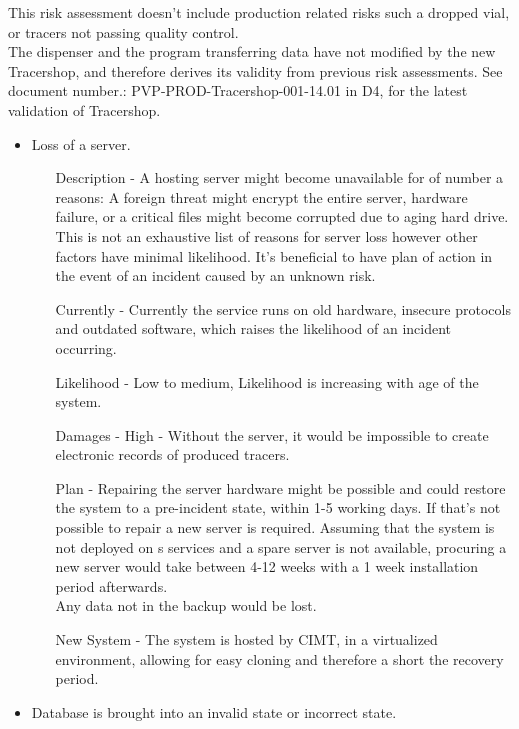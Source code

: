 \documentclass{article}
\begin{document}
This risk assessment doesn't include production related risks such a dropped
vial, or tracers not passing quality control.\\
The dispenser and the program transferring data have not modified by the new
Tracershop, and therefore derives its validity from previous risk assessments.
See document number.: PVP-PROD-Tracershop-001-14.01 in D4, for the latest
validation of Tracershop.

\begin{itemize}
  \item Loss of a server.
  \begin{itemize}
    \item[Description] - A hosting server might become unavailable for of number
    a reasons:
    A foreign threat might encrypt the entire server, hardware failure, or a
    critical files might become corrupted due to aging hard drive.
    This is not an exhaustive list of reasons for server loss however other
    factors have minimal likelihood.
    It's beneficial to have plan of action in the event of an incident caused by
    an unknown risk.
    \item[Currently] - Currently the service runs on old hardware, insecure
    protocols and outdated software, which raises the likelihood of an incident
    occurring.
    \item[Likelihood] - Low to medium, Likelihood is increasing with age of the
    system.
    \item[Damages] - High - Without the server, it would be impossible to create
    electronic records of produced tracers.
    \item[Plan] - Repairing the server hardware might be possible and could
    restore the system to a pre-incident state, within 1-5 working days.
    If that's not possible to repair a new server is required. Assuming that the
    system is not deployed on s services and a spare server is not
    available, procuring a new server would take between 4-12 weeks with a 1
    week installation period afterwards.\\
    Any data not in the backup would be lost.
    \item[New System] - The system is hosted by CIMT, in a virtualized
    environment, allowing for easy cloning and therefore a short the recovery
    period.
  \end{itemize}
  \item Database is brought into an invalid state or incorrect state.
  \begin{itemize}

\end{itemize}
\end{itemize}
\end{document}
